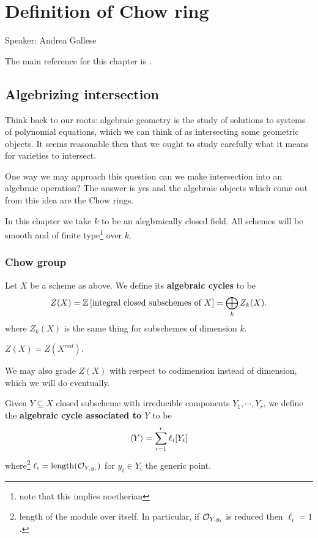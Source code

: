\chapter{Definition of Chow ring}
\begin{center}
	{\huge Speaker: Andrea Gallese}
\end{center}
\bigskip

\noindent
The main reference for this chapter is \cite{eisenbud20163264}.

\section{Algebrizing intersection}
Think back to our roots: algebraic geometry is the study of solutions to systems of polynomial equations, which we can think of as intersecting some geometric objects. It seems reasonable then that we ought to study carefully what it means for varieties to intersect. 

One way we may approach this question can we make intersection into an algebraic operation? The answer is yes and the algebraic objects which come out from this idea are the Chow rings.

\bigskip

\noindent
In this chapter we take $k$ to be an alegbraically closed field. All schemes will be smooth and of finite type\footnote{note that this implies noetherian} over $k$.

\subsection{Chow group}
\begin{definition}[]
Let $X$ be a scheme as above. We define its \textbf{algebraic cycles} to be
\[Z(X)=\mathbb{Z}\left[{\text{integral closed subschemes of $X$}}\right]=\bigoplus_{k}Z_k(X).\]
where $Z_k(X)$ is the same thing for subschemes of dimension $k$.
\end{definition}

\begin{remark}
$Z(X)=Z(X^{red})$.
\end{remark}

\begin{remark}
We may also grade $Z(X)$ with respect to codimension instead of dimension, which we will do eventually.
\end{remark}


\begin{definition}
Given $Y\subseteq X$ closed subscheme with irreducible components $Y_1,\cdots, Y_r$, we define the \textbf{algebraic cycle associated to $Y$} to be
\[\left\langle {Y}\right\rangle=\sum_{i=1}^r \ell_i[Y_i]\]
where\footnote{length of the module over itself. In particular, if $\mathcal{O}_{Y,y_i}$ is reduced then $\ell_i=1$.} $\ell_i=\operatorname{length}(\mathcal{O}_{Y,y_i})$ for $y_i\in Y_i$ the generic point.
\end{definition}

